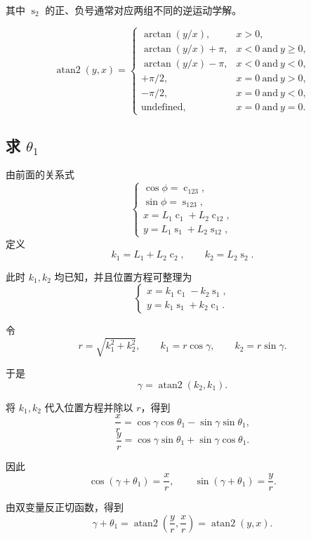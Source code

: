 其中 $\operatorname{s}_{2}$ 的正、负号通常对应两组不同的逆运动学解。

\begin{note}
    $$
    \operatorname{atan2}(y,x)=
    \begin{cases}
    \arctan(y/x), & x>0,\\
    \arctan(y/x)+\pi, & x<0\ \text{and}\ y\geq 0,\\
    \arctan(y/x)-\pi, & x<0\ \text{and}\ y<0,\\
    +\pi/2, & x=0\ \text{and}\ y>0,\\
    -\pi/2, & x=0\ \text{and}\ y<0,\\
    \text{undefined}, & x=0\ \text{and}\ y=0.
    \end{cases}
    $$
\end{note}

\subsection{求 $\theta_1$}

由前面的关系式
$$
\begin{cases}
\cos\phi=\operatorname{c}_{123},\\
\sin\phi=\operatorname{s}_{123},\\
x=L_1\operatorname{c}_{1}+L_2\operatorname{c}_{12},\\
y=L_1\operatorname{s}_{1}+L_2\operatorname{s}_{12},
\end{cases}
$$
定义
$$
 k_1=L_1+L_2\operatorname{c}_{2},\qquad k_2=L_2\operatorname{s}_{2}.
$$

此时 $k_1,k_2$ 均已知，并且位置方程可整理为
$$
\begin{cases}
x=k_1\operatorname{c}_{1}-k_2\operatorname{s}_{1},\\
y=k_1\operatorname{s}_{1}+k_2\operatorname{c}_{1}.
\end{cases}
$$

令
$$
r=\sqrt{k_1^2+k_2^2},\qquad k_1=r\cos\gamma,\qquad k_2=r\sin\gamma.
$$

于是
$$
\gamma=\operatorname{atan2}(k_2,k_1).
$$

将 $k_1,k_2$ 代入位置方程并除以 $r$，得到
$$
\frac{x}{r}=\cos\gamma\cos\theta_1-\sin\gamma\sin\theta_1,
$$
$$
\frac{y}{r}=\cos\gamma\sin\theta_1+\sin\gamma\cos\theta_1.
$$

因此
$$
\cos(\gamma+\theta_1)=\frac{x}{r},\qquad
\sin(\gamma+\theta_1)=\frac{y}{r}.
$$

由双变量反正切函数，得到
$$
\gamma+\theta_1=\operatorname{atan2}\left(\frac{y}{r},\frac{x}{r}\right)=\operatorname{atan2}(y,x).
$$

